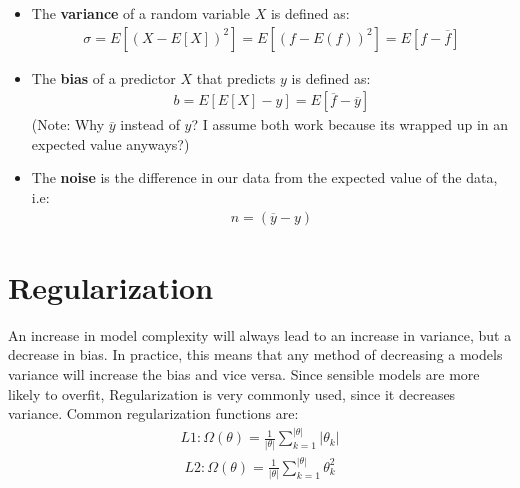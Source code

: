 \documentclass{report}
\newcommand{\tbf}{\textbf}
\begin{document}
\begin{itemize}
 \item The \tbf{variance} of a random variable $X$ is defined as:
 \begin{align}
  \sigma = E[(X - E[X])^2] = E[(f - E(f))^2] = E[f - \overline{f}]
 \end{align}
 \item The \tbf{bias} of a predictor $X$ that predicts $y$ is defined as:
 \begin{align}
  b = E[E[X] - y] = E[\overline{f} - \overline{y}]
 \end{align}
 (Note: Why $\overline{y}$ instead of $y$? I assume both work because its wrapped up in an expected value anyways?)
 \item The \tbf{noise} is the difference in our data from the expected value of the data, i.e:
 \begin{align}
  n = (\overline{y} - y)
 \end{align}
\end{itemize}
%
\section{Regularization}
An increase in model complexity will always lead to an increase in variance, but a decrease in bias. In practice, this means that any method of decreasing a models variance will increase the bias and vice versa. Since sensible models are more likely to overfit, Regularization is very commonly used, since it decreases variance. Common regularization functions are:
\begin{align}
 L1: \Omega(\theta) = \frac{1}{|\theta|} \sum_{k=1}^{|\theta|} |\theta_k|
\end{align}
\begin{align}
 L2: \Omega(\theta) = \frac{1}{|\theta|} \sum_{k=1}^{|\theta|} \theta_k^2
\end{align}
%
\end{document}
